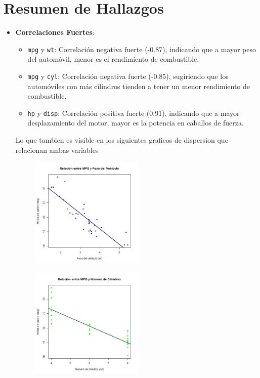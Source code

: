 \documentclass{article}
\begin{document}
\section{Resumen de Hallazgos}
\begin{itemize}
    \item \textbf{Correlaciones Fuertes}:
          \begin{itemize}
              \item \texttt{mpg} y \texttt{wt}: Correlación negativa fuerte (-0.87), indicando que a mayor peso del automóvil, menor es el rendimiento de combustible.
              \item \texttt{mpg} y \texttt{cyl}: Correlación negativa fuerte (-0.85), sugiriendo que los automóviles con más cilindros tienden a tener un menor rendimiento de combustible.
              \item \texttt{hp} y \texttt{disp}: Correlación positiva fuerte (0.91), indicando que a mayor desplazamiento del motor, mayor es la potencia en caballos de fuerza.
          \end{itemize}
          Lo que tambien es visible en los siguientes graficos de dispersion que relacionan ambas variables

          \begin{figure}[H]
              \centering
              \includegraphics[width=0.5\textwidth]{mpg_vs_wt.png}
              \label{fig:mpg_vs_wt}
              \vspace{0.5cm} %
          \end{figure}

          \begin{figure}[H]
              \centering
              \includegraphics[width=0.5\textwidth]{mpg_vs_cyl.png}
              \label{fig:mpg_vs_cyl}
              \vspace{0.5cm} %
          \end{figure}


\end{itemize}
\end{document}
